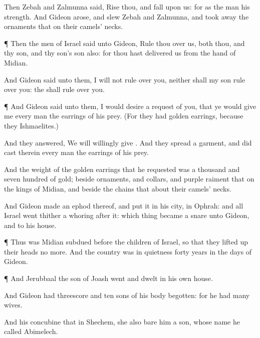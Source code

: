 {Then
Zebah and
Zalmunna
said,
Rise thou, and
fall upon us: for as the
man
{} his
strength. And
Gideon
arose, and
slew
Zebah and
Zalmunna, and took
away the
ornaments that
{} on their
camels’
necks.


\par }{\PP {}¶ Then the
men of
Israel
said unto
Gideon,
Rule thou over us, both thou, and thy
son, and thy
son’s
son also: for thou hast
delivered us from the
hand of
Midian.

And
Gideon
said unto them, I will not
rule over you, neither shall my
son
rule over you: the
{} shall
rule over you.


\par }{\PP {}¶ And
Gideon
said unto them, I would
desire a
request of you, that ye would
give me every
man the
earrings of his
prey. (For they had
golden
earrings, because they
{}
Ishmaelites.)

And they
answered, We will
willingly
give
{}. And they
spread a
garment, and did
cast therein every
man the
earrings of his
prey.

And the
weight of the
golden
earrings that he
requested was a
thousand and
seven
hundred
{} of
gold; beside
ornaments, and
collars, and
purple
raiment that
{} on the
kings of
Midian, and beside the
chains that
{} about their
camels’
necks.

And
Gideon
made an
ephod thereof, and
put it in his
city,
{} in
Ophrah: and all
Israel went thither a
whoring
after it: which thing became a
snare unto
Gideon, and to his
house.


\par }{\PP {}¶ Thus was
Midian
subdued
before the
children of
Israel, so that they lifted
up their
heads no
more. And the
country was in
quietness
forty
years in the
days of
Gideon.


\par }{\PP {}¶ And
Jerubbaal the
son of
Joash
went and
dwelt in his own
house.

And
Gideon had threescore and
ten
sons of his
body
begotten: for he had
many
wives.

And his
concubine that
{} in
Shechem, she also
bare him a
son, whose
name he
called
Abimelech.


}
